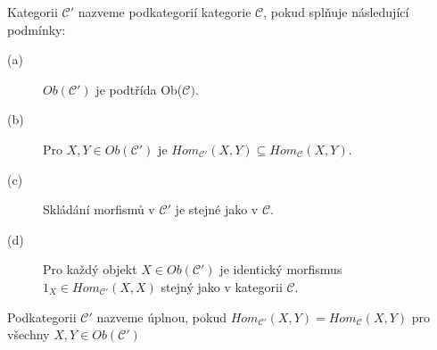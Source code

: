     \begin{dfn}
      Kategorii $\mathcal C'$ nazveme podkategorií kategorie $\mathcal C$, pokud 
      splňuje následující podmínky:
      \begin{description}
        \item[(a)] $Ob(\mathcal C')$ je podtřída Ob($\mathcal C)$.
        \item[(b)] Pro $X,Y\in Ob(\mathcal C')$ je $Hom_{\mathcal C'}(X,Y)\subseteq Hom_{\mathcal C}(X,Y)$.
        \item[(c)] Skládání morfismů v $\mathcal C'$ je stejné jako v $\mathcal C$. 
        \item[(d)] Pro každý objekt $X\in Ob(\mathcal C')$ je identický 
          morfismus $1_X\in Hom_{\mathcal C'}(X,X)$ stejný jako v kategorii $\mathcal  C$.
      \end{description}
      Podkategorii $\mathcal C'$ nazveme úplnou, pokud 
      $Hom_{\mathcal C'}(X,Y)=Hom_{\mathcal C}(X,Y)$ 
      pro všechny $X,Y\in Ob(\mathcal C')$
    \end{dfn}
    

%
%      

